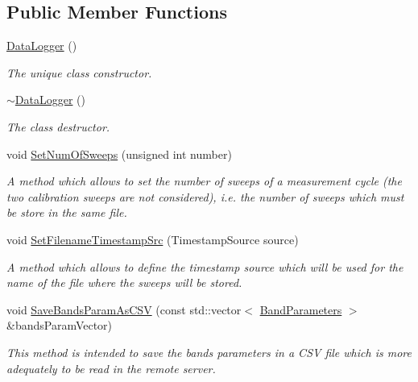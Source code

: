 \subsection*{Public Member Functions}
\begin{DoxyCompactItemize}
\item 
\hyperlink{classDataLogger_a7abebacd4747644d22982f9676466bad}{Data\+Logger} ()
\begin{DoxyCompactList}\small\item\em The unique class constructor. \end{DoxyCompactList}\item 
\mbox{\label{classDataLogger_a9aaff109f3e7749a0a0a0313655da50a}} 
\hyperlink{classDataLogger_a9aaff109f3e7749a0a0a0313655da50a}{$\sim$\+Data\+Logger} ()
\begin{DoxyCompactList}\small\item\em The class destructor. \end{DoxyCompactList}\item 
\mbox{\label{classDataLogger_a5148797e38cdb1538bcf794939b9b4a6}} 
void \hyperlink{classDataLogger_a5148797e38cdb1538bcf794939b9b4a6}{Set\+Num\+Of\+Sweeps} (unsigned int number)
\begin{DoxyCompactList}\small\item\em A method which allows to set the number of sweeps of a measurement cycle (the two calibration sweeps are not considered), i.\+e. the number of sweeps which must be store in the same file. \end{DoxyCompactList}\item 
\mbox{\label{classDataLogger_acbde5e2f6c1dafdedc285f1a42d994bb}} 
void \hyperlink{classDataLogger_acbde5e2f6c1dafdedc285f1a42d994bb}{Set\+Filename\+Timestamp\+Src} (Timestamp\+Source source)
\begin{DoxyCompactList}\small\item\em A method which allows to define the timestamp source which will be used for the name of the file where the sweeps will be stored. \end{DoxyCompactList}\item 
void \hyperlink{classDataLogger_a2ffe9fb45883c2880e1c45a4406fc22b}{Save\+Bands\+Param\+As\+C\+SV} (const std\+::vector$<$ \hyperlink{structBandParameters}{Band\+Parameters} $>$ \&bands\+Param\+Vector)
\begin{DoxyCompactList}\small\item\em This method is intended to save the bands parameters in a C\+SV file which is more adequately to be read in the remote server. \end{DoxyCompactList}\item 

\end{DoxyCompactItemize}
